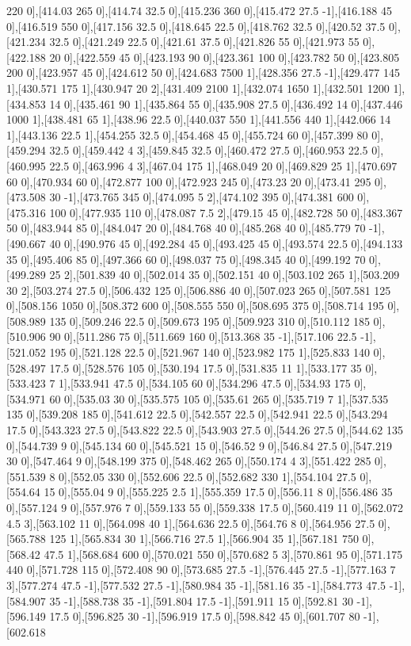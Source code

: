 {220 0],[414.03 265 0],[414.74 32.5 0],[415.236 360 0],[415.472 27.5 -1],[416.188 45 0],[416.519 550 0],[417.156 32.5 0],[418.645 22.5 0],[418.762 32.5 0],[420.52 37.5 0],[421.234 32.5 0],[421.249 22.5 0],[421.61 37.5 0],[421.826 55 0],[421.973 55 0],[422.188 20 0],[422.559 45 0],[423.193 90 0],[423.361 100 0],[423.782 50 0],[423.805 200 0],[423.957 45 0],[424.612 50 0],[424.683 7500 1],[428.356 27.5 -1],[429.477 145 1],[430.571 175 1],[430.947 20 2],[431.409 2100 1],[432.074 1650 1],[432.501 1200 1],[434.853 14 0],[435.461 90 1],[435.864 55 0],[435.908 27.5 0],[436.492 14 0],[437.446 1000 1],[438.481 65 1],[438.96 22.5 0],[440.037 550 1],[441.556 440 1],[442.066 14 1],[443.136 22.5 1],[454.255 32.5 0],[454.468 45 0],[455.724 60 0],[457.399 80 0],[459.294 32.5 0],[459.442 4 3],[459.845 32.5 0],[460.472 27.5 0],[460.953 22.5 0],[460.995 22.5 0],[463.996 4 3],[467.04 175 1],[468.049 20 0],[469.829 25 1],[470.697 60 0],[470.934 60 0],[472.877 100 0],[472.923 245 0],[473.23 20 0],[473.41 295 0],[473.508 30 -1],[473.765 345 0],[474.095 5 2],[474.102 395 0],[474.381 600 0],[475.316 100 0],[477.935 110 0],[478.087 7.5 2],[479.15 45 0],[482.728 50 0],[483.367 50 0],[483.944 85 0],[484.047 20 0],[484.768 40 0],[485.268 40 0],[485.779 70 -1],[490.667 40 0],[490.976 45 0],[492.284 45 0],[493.425 45 0],[493.574 22.5 0],[494.133 35 0],[495.406 85 0],[497.366 60 0],[498.037 75 0],[498.345 40 0],[499.192 70 0],[499.289 25 2],[501.839 40 0],[502.014 35 0],[502.151 40 0],[503.102 265 1],[503.209 30 2],[503.274 27.5 0],[506.432 125 0],[506.886 40 0],[507.023 265 0],[507.581 125 0],[508.156 1050 0],[508.372 600 0],[508.555 550 0],[508.695 375 0],[508.714 195 0],[508.989 135 0],[509.246 22.5 0],[509.673 195 0],[509.923 310 0],[510.112 185 0],[510.906 90 0],[511.286 75 0],[511.669 160 0],[513.368 35 -1],[517.106 22.5 -1],[521.052 195 0],[521.128 22.5 0],[521.967 140 0],[523.982 175 1],[525.833 140 0],[528.497 17.5 0],[528.576 105 0],[530.194 17.5 0],[531.835 11 1],[533.177 35 0],[533.423 7 1],[533.941 47.5 0],[534.105 60 0],[534.296 47.5 0],[534.93 175 0],[534.971 60 0],[535.03 30 0],[535.575 105 0],[535.61 265 0],[535.719 7 1],[537.535 135 0],[539.208 185 0],[541.612 22.5 0],[542.557 22.5 0],[542.941 22.5 0],[543.294 17.5 0],[543.323 27.5 0],[543.822 22.5 0],[543.903 27.5 0],[544.26 27.5 0],[544.62 135 0],[544.739 9 0],[545.134 60 0],[545.521 15 0],[546.52 9 0],[546.84 27.5 0],[547.219 30 0],[547.464 9 0],[548.199 375 0],[548.462 265 0],[550.174 4 3],[551.422 285 0],[551.539 8 0],[552.05 330 0],[552.606 22.5 0],[552.682 330 1],[554.104 27.5 0],[554.64 15 0],[555.04 9 0],[555.225 2.5 1],[555.359 17.5 0],[556.11 8 0],[556.486 35 0],[557.124 9 0],[557.976 7 0],[559.133 55 0],[559.338 17.5 0],[560.419 11 0],[562.072 4.5 3],[563.102 11 0],[564.098 40 1],[564.636 22.5 0],[564.76 8 0],[564.956 27.5 0],[565.788 125 1],[565.834 30 1],[566.716 27.5 1],[566.904 35 1],[567.181 750 0],[568.42 47.5 1],[568.684 600 0],[570.021 550 0],[570.682 5 3],[570.861 95 0],[571.175 440 0],[571.728 115 0],[572.408 90 0],[573.685 27.5 -1],[576.445 27.5 -1],[577.163 7 3],[577.274 47.5 -1],[577.532 27.5 -1],[580.984 35 -1],[581.16 35 -1],[584.773 47.5 -1],[584.907 35 -1],[588.738 35 -1],[591.804 17.5 -1],[591.911 15 0],[592.81 30 -1],[596.149 17.5 0],[596.825 30 -1],[596.919 17.5 0],[598.842 45 0],[601.707 80 -1],[602.618 }
